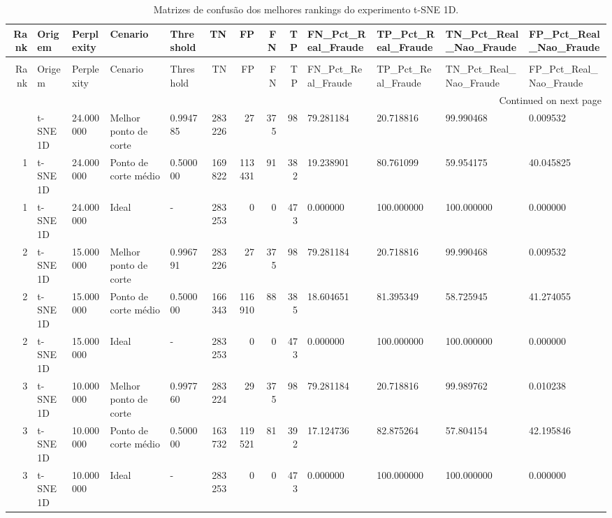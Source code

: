 \begin{longtable}{rllllrrrrllll}
\caption{Matrizes de confusão dos melhores rankings do experimento t-SNE 1D.} \label{tab:matrizes-ranks-tsne-1d} \\
\toprule
Rank & Origem & Perplexity & Cenario & Threshold & TN & FP & FN & TP & FN\_Pct\_Real\_Fraude & TP\_Pct\_Real\_Fraude & TN\_Pct\_Real\_Nao\_Fraude & FP\_Pct\_Real\_Nao\_Fraude \\
\midrule
\endfirsthead
\caption[]{Matrizes de confusão dos melhores rankings do experimento t-SNE 1D.} \\
\toprule
Rank & Origem & Perplexity & Cenario & Threshold & TN & FP & FN & TP & FN\_Pct\_Real\_Fraude & TP\_Pct\_Real\_Fraude & TN\_Pct\_Real\_Nao\_Fraude & FP\_Pct\_Real\_Nao\_Fraude \\
\midrule
\endhead
\midrule
\multicolumn{13}{r}{Continued on next page} \\
\midrule
\endfoot
\bottomrule
\endlastfoot
1 & t-SNE 1D & 24.000000 & Melhor ponto de corte & 0.994785 & 283226 & 27 & 375 & 98 & 79.281184 & 20.718816 & 99.990468 & 0.009532 \\
1 & t-SNE 1D & 24.000000 & Ponto de corte médio & 0.500000 & 169822 & 113431 & 91 & 382 & 19.238901 & 80.761099 & 59.954175 & 40.045825 \\
1 & t-SNE 1D & 24.000000 & Ideal & - & 283253 & 0 & 0 & 473 & 0.000000 & 100.000000 & 100.000000 & 0.000000 \\
2 & t-SNE 1D & 15.000000 & Melhor ponto de corte & 0.996791 & 283226 & 27 & 375 & 98 & 79.281184 & 20.718816 & 99.990468 & 0.009532 \\
2 & t-SNE 1D & 15.000000 & Ponto de corte médio & 0.500000 & 166343 & 116910 & 88 & 385 & 18.604651 & 81.395349 & 58.725945 & 41.274055 \\
2 & t-SNE 1D & 15.000000 & Ideal & - & 283253 & 0 & 0 & 473 & 0.000000 & 100.000000 & 100.000000 & 0.000000 \\
3 & t-SNE 1D & 10.000000 & Melhor ponto de corte & 0.997760 & 283224 & 29 & 375 & 98 & 79.281184 & 20.718816 & 99.989762 & 0.010238 \\
3 & t-SNE 1D & 10.000000 & Ponto de corte médio & 0.500000 & 163732 & 119521 & 81 & 392 & 17.124736 & 82.875264 & 57.804154 & 42.195846 \\
3 & t-SNE 1D & 10.000000 & Ideal & - & 283253 & 0 & 0 & 473 & 0.000000 & 100.000000 & 100.000000 & 0.000000 \\
\end{longtable}

